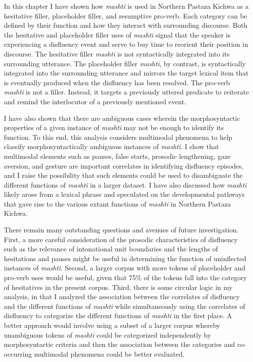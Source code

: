 \documentclass[output=paper]{langscibook}
\begin{document}
In this chapter I have shown how \textit{mashti} is used in Northern Pastaza Kichwa as a hesitative filler, placeholder filler, and resumptive pro-verb. Each category can be defined by their function and how they interact with surrounding discourse. Both the hesitative and placeholder filler uses of \textit{mashti} signal that the speaker is experiencing a disfluency event and serve to buy time to reorient their position in discourse. The hesitative filler \textit{mashti} is not syntactically integrated into its surrounding utterance. The placeholder filler \textit{mashti}, by contrast, is syntactically integrated into the surrounding utterance and mirrors the target lexical item that is eventually produced when the disfluency has been resolved. The pro-verb \textit{mashti} is not a filler. Instead, it targets a previously uttered predicate to reiterate and remind the interlocutor of a previously mentioned event.

I have also shown that there are ambiguous cases wherein the morphosyntactic properties of a given instance of \textit{mashti} may not be enough to identify its function. To this end, this analysis considers multimodal phenomena to help classify morphosyntactically ambiguous instances of \textit{mashti}. I show that multimodal elements such as pauses, false starts, prosodic lengthening, gaze aversion, and gesture are important correlates in identifying disfluency episodes, and I raise the possibility that such elements could be used to disambiguate the different functions of \textit{mashti} in a larger dataset. I have also discussed how \textit{mashti} likely arose from a lexical phrase and speculated on the developmental pathways that gave rise to the various extant functions of \textit{mashti} in Northern Pastaza Kichwa. 

There remain many outstanding questions and avenues of future investigation. First, a more careful consideration of the prosodic characteristics of disfluency such as the relevance of intonational unit boundaries and the lengths of hesitations and pauses might be useful in determining the function of uninflected instances of \textit{mashti}. Second, a larger corpus with more tokens of placeholder and pro-verb uses would be useful, given that 75\% of the tokens fall into the category of hesitatives in the present corpus. Third, there is some circular logic in my analysis, in that I analyzed the association between the correlates of disfluency and the different functions of \textit{mashti} while simultaneously using the correlates of disfluency to categorize the different functions of \textit{mashti} in the first place. A better approach would involve using a subset of a larger corpus whereby unambiguous tokens of \textit{mashti} could be categorized independently by morphosyntactic criteria and then the association between the categories and co-occurring multimodal phenomena could be better evaluated.
\end{document}
